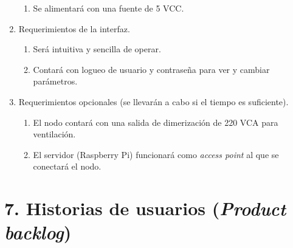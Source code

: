 \documentclass[
11pt, %
]{charter}
\begin{document}
\begin{enumerate}
\begin{enumerate}
			\item Se alimentará con una fuente de 5 VCC.
		\end{enumerate}
	\item Requerimientos de la interfaz.
		\begin{enumerate}
			\item Será intuitiva y sencilla de operar.
			\item Contará con logueo de usuario y contraseña para ver y cambiar parámetros.
		\end{enumerate}
	\item Requerimientos opcionales (se llevarán a cabo si el tiempo es suficiente).
		\begin{enumerate}
			\item El nodo contará con una salida de dimerización de 220 VCA para ventilación.
			\item El servidor (Raspberry Pi) funcionará como \textit{access point} al que se conectará el nodo.
		\end{enumerate}
\end{enumerate}

\section{7. Historias de usuarios (\textit{Product backlog})}
\label{sec:backlog}
\end{document}
